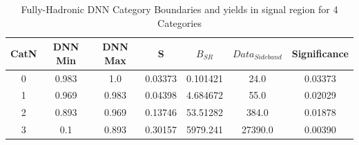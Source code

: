 \begin{table}[!htbp]
  \begin{center}
    \begin{tabular}{|c|c|c|c|c|c|c|}
    \hline
    CatN & DNN Min & DNN Max & S        & $B_{SR}$   & $Data_{Sideband}$ & Significance\\ \hline \hline
    0    & 0.983   & 1.0     & 0.03373  & 0.101421   & 24.0              & 0.03373 \\
    1    & 0.969   & 0.983   & 0.04398  & 4.684672   & 55.0              & 0.02029 \\
    2    & 0.893   & 0.969   & 0.13746  & 53.51282   & 384.0             & 0.01878 \\
    3    & 0.1     & 0.893   & 0.30157  & 5979.241   & 27390.0           & 0.00390 \\
    \hline
    \end{tabular}
  \end{center}
\caption{
    Fully-Hadronic DNN Category Boundaries and yields in signal region for 4 Categories
}
\label{tab:FHcategories_4}
\end{table}


